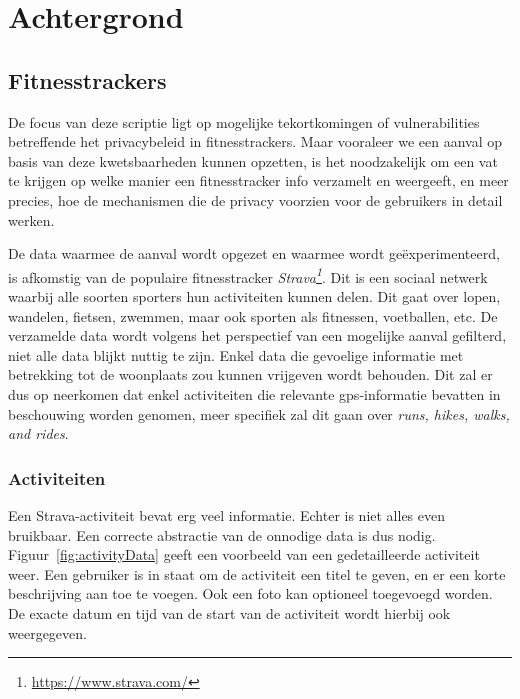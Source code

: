 
\chapter{Achtergrond}

\section{Fitnesstrackers}
De focus van deze scriptie ligt op mogelijke tekortkomingen of vulnerabilities
betreffende het privacybeleid in fitnesstrackers. Maar vooraleer we een aanval
op basis van deze kwetsbaarheden kunnen opzetten, is het noodzakelijk om een
vat te krijgen op welke manier een fitnesstracker info verzamelt en weergeeft,
en meer precies, hoe de mechanismen die de privacy voorzien voor de gebruikers
in detail werken.

De data waarmee de aanval wordt opgezet en waarmee wordt geëxperimenteerd, is
afkomstig van de populaire fitnesstracker
\textit{Strava\footnote{\url{https://www.strava.com/}}}. Dit is een sociaal
netwerk waarbij alle soorten sporters hun activiteiten kunnen delen. Dit gaat
over lopen, wandelen, fietsen, zwemmen, maar ook sporten als fitnessen,
voetballen, etc. De verzamelde data wordt volgens het perspectief van een
mogelijke aanval gefilterd, niet alle data blijkt nuttig te zijn. Enkel data
die gevoelige informatie met betrekking tot de woonplaats zou kunnen vrijgeven
wordt behouden. Dit zal er dus op neerkomen dat enkel activiteiten die
relevante \ac{gps}-informatie bevatten in beschouwing worden genomen, meer
specifiek zal dit gaan over \textit{runs, hikes, walks, and rides}.

\subsection{Activiteiten}\label{data}
Een Strava-activiteit bevat erg veel informatie. Echter is niet alles even
bruikbaar. Een correcte abstractie van de onnodige data is dus nodig.
Figuur~\ref{fig:activityData} geeft een voorbeeld van een gedetailleerde
activiteit weer. Een gebruiker is in staat om de activiteit een titel te geven,
en er een korte beschrijving aan toe te voegen. Ook een foto kan optioneel
toegevoegd worden. De exacte datum en tijd van de start van de activiteit wordt
hierbij ook weergegeven.

